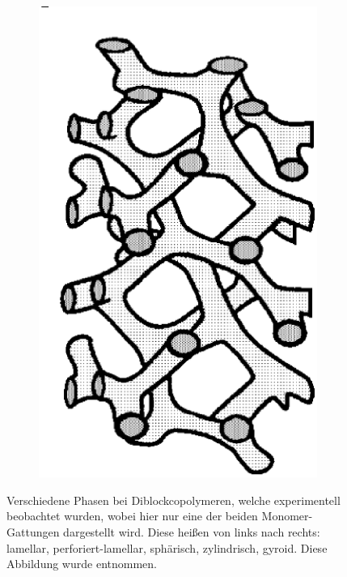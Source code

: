 \documentclass[../main.tex]{subfiles}
\begin{document}
\begin{figure}[tb]
\begin{subfigure}[b]{0.15\textwidth}
        \includegraphics[width=\textwidth]{figures/einleitung/phase5}
    \end{subfigure}
    \caption[Verschiedene Phasen bei Diblockcopolymeren.]{%
        Verschiedene Phasen bei Diblockcopolymeren, welche experimentell beobachtet wurden, wobei hier nur eine der beiden Monomer-Gattungen dargestellt wird.
        Diese heißen von links nach rechts: lamellar, perforiert-lamellar, sphärisch, zylindrisch, gyroid.
        Diese Abbildung wurde \cite[Figure 1.18]{Matsen:2006ud} entnommen.
    }
    \label{figure:phasen}
\end{figure}
\end{document}
